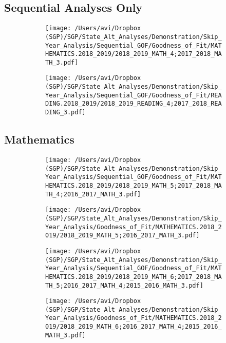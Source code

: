 \documentclass[12pt]{article}
\begin{document}
\hypertarget{sequential-analyses-only}{%
\subsection{Sequential Analyses Only}\label{sequential-analyses-only}}

\begin{figure}[H]
\caption*{{{\bf{Figure A1:}} } Sequential growth goodness of fit plots for 4$^{th}$ grade Mathematics and Reading (no skip-year analyses)}
  \begin{subfigure}[b]{0.5\textwidth}
    \texttt{[image: /Users/avi/Dropbox (SGP)/SGP/State\_Alt\_Analyses/Demonstration/Skip\_Year\_Analysis/Sequential\_GOF/Goodness\_of\_Fit/MATHEMATICS.2018\_2019/2018\_2019\_MATH\_4;2017\_2018\_MATH\_3.pdf]}
  \end{subfigure}
  \begin{subfigure}[b]{0.5\textwidth}
    \texttt{[image: /Users/avi/Dropbox (SGP)/SGP/State\_Alt\_Analyses/Demonstration/Skip\_Year\_Analysis/Sequential\_GOF/Goodness\_of\_Fit/READING.2018\_2019/2018\_2019\_READING\_4;2017\_2018\_READING\_3.pdf]}
  \end{subfigure}
\end{figure}

\hypertarget{mathematics}{%
\subsection{Mathematics}\label{mathematics}}

\begin{figure}[H]
\caption*{{{\bf{Figure A2:}} } Sequential (left) and skip-year (right) fit plots for Math (grades 5 - 6)}
  \begin{subfigure}[b]{0.5\textwidth}
    \texttt{[image: /Users/avi/Dropbox (SGP)/SGP/State\_Alt\_Analyses/Demonstration/Skip\_Year\_Analysis/Sequential\_GOF/Goodness\_of\_Fit/MATHEMATICS.2018\_2019/2018\_2019\_MATH\_5;2017\_2018\_MATH\_4;2016\_2017\_MATH\_3.pdf]}
  \end{subfigure}
  \begin{subfigure}[b]{0.5\textwidth}
    \texttt{[image: /Users/avi/Dropbox (SGP)/SGP/State\_Alt\_Analyses/Demonstration/Skip\_Year\_Analysis/Goodness\_of\_Fit/MATHEMATICS.2018\_2019/2018\_2019\_MATH\_5;2016\_2017\_MATH\_3.pdf]}
  \end{subfigure}
  \begin{subfigure}[b]{0.5\textwidth}
    \texttt{[image: /Users/avi/Dropbox (SGP)/SGP/State\_Alt\_Analyses/Demonstration/Skip\_Year\_Analysis/Sequential\_GOF/Goodness\_of\_Fit/MATHEMATICS.2018\_2019/2018\_2019\_MATH\_6;2017\_2018\_MATH\_5;2016\_2017\_MATH\_4;2015\_2016\_MATH\_3.pdf]}
  \end{subfigure}
  \begin{subfigure}[b]{0.5\textwidth}
    \texttt{[image: /Users/avi/Dropbox (SGP)/SGP/State\_Alt\_Analyses/Demonstration/Skip\_Year\_Analysis/Goodness\_of\_Fit/MATHEMATICS.2018\_2019/2018\_2019\_MATH\_6;2016\_2017\_MATH\_4;2015\_2016\_MATH\_3.pdf]}
  \end{subfigure}
\end{figure}
\end{document}
